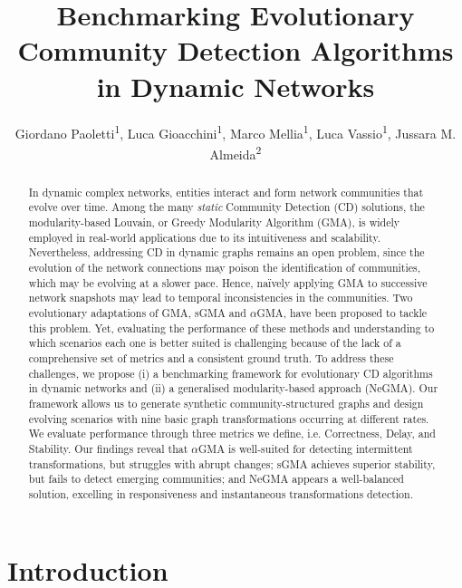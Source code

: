 \documentclass[letterpaper]{article}
\title{Benchmarking Evolutionary Community Detection Algorithms\\in Dynamic Networks}
\author{
    Giordano Paoletti\textsuperscript{\rm 1},
    Luca Gioacchini\textsuperscript{\rm 1},
    Marco Mellia\textsuperscript{\rm 1},
    Luca Vassio\textsuperscript{\rm 1},
    Jussara M. Almeida\textsuperscript{\rm 2}
}
\begin{document}
\maketitle


\newcommand{\ie}{\mbox{i.e.}\xspace}
\newcommand{\eg}{\mbox{e.g.}\xspace}

\begin{abstract}

In dynamic complex networks, entities interact and form network communities that evolve over time. Among the many \emph{static} Community Detection (CD) solutions, the modularity-based Louvain, or Greedy Modularity Algorithm (GMA), is widely employed in real-world applications due to its intuitiveness and scalability. Nevertheless, addressing CD in dynamic graphs remains an open problem, since the evolution of the network connections may poison the identification of communities, which may be evolving at a slower pace. Hence, na\"ively applying GMA to successive network snapshots may lead to temporal inconsistencies in the communities. Two evolutionary adaptations of GMA, sGMA and $\alpha$GMA, have been proposed to tackle this problem. Yet, evaluating the performance of these methods and understanding to which scenarios each one is better suited is challenging because of the lack of a comprehensive set of metrics and a consistent ground truth. To address these challenges, we propose (i) a benchmarking framework for evolutionary CD algorithms in dynamic networks and (ii) a generalised modularity-based approach (NeGMA). Our framework allows us to generate synthetic community-structured graphs and design evolving scenarios with nine basic graph transformations occurring at different rates. We evaluate performance through three metrics we define, \ie Correctness, Delay, and Stability. Our findings reveal that $\alpha$GMA is well-suited for detecting intermittent transformations, but struggles with abrupt changes; sGMA achieves superior stability, but fails to detect emerging communities; and NeGMA appears a well-balanced solution, excelling in responsiveness and instantaneous transformations detection.

\end{abstract}

\section{Introduction}
\label{s:introduction}
\end{document}
